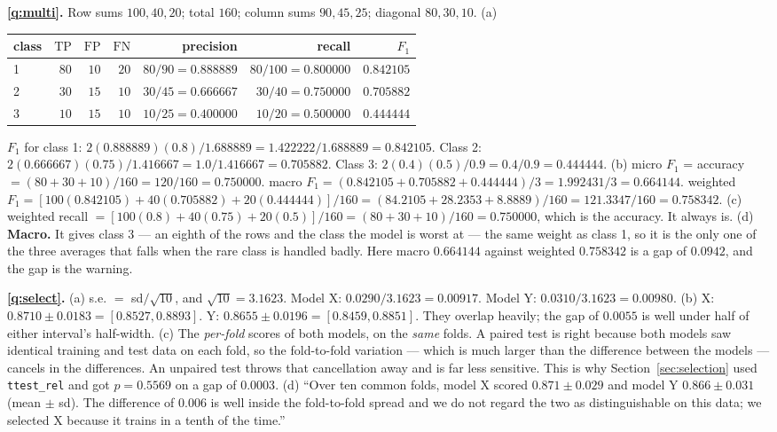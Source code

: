 \documentclass[11pt]{article}
\newcommand{\TP}{\mathrm{TP}}
\newcommand{\FP}{\mathrm{FP}}
\newcommand{\FN}{\mathrm{FN}}
\begin{document}
\medskip
\textbf{\ref{q:multi}.} Row sums $100, 40, 20$; total $160$; column sums
$90, 45, 25$; diagonal $80, 30, 10$.
(a)
\begin{center}\small
\begin{tabular}{@{}lrrrrrr@{}}
\toprule
class & $\TP$ & $\FP$ & $\FN$ & precision & recall & $F_1$\\
\midrule
1 & $80$ & $10$ & $20$ & $80/90 = 0.888889$ & $80/100 = 0.800000$ & $0.842105$\\
2 & $30$ & $15$ & $10$ & $30/45 = 0.666667$ & $30/40 = 0.750000$ & $0.705882$\\
3 & $10$ & $15$ & $10$ & $10/25 = 0.400000$ & $10/20 = 0.500000$ & $0.444444$\\
\bottomrule
\end{tabular}
\end{center}
$F_1$ for class 1: $2(0.888889)(0.8)/1.688889 = 1.422222/1.688889 = 0.842105$.
Class 2: $2(0.666667)(0.75)/1.416667 = 1.0/1.416667 = 0.705882$.
Class 3: $2(0.4)(0.5)/0.9 = 0.4/0.9 = 0.444444$.
(b) micro $F_1$ = accuracy $= (80 + 30 + 10)/160 = 120/160 = \mathbf{0.750000}$.
macro $F_1 = (0.842105 + 0.705882 + 0.444444)/3 = 1.992431/3 =
\mathbf{0.664144}$.
weighted $F_1 = [100(0.842105) + 40(0.705882) + 20(0.444444)]/160
= (84.2105 + 28.2353 + 8.8889)/160 = 121.3347/160 = \mathbf{0.758342}$.
(c) weighted recall $= [100(0.8) + 40(0.75) + 20(0.5)]/160 = (80 + 30 + 10)/160
= 0.750000$, which is the accuracy. It always is.
(d) \textbf{Macro.} It gives class 3 --- an eighth of the rows and the class the
model is worst at --- the same weight as class 1, so it is the only one of the
three averages that falls when the rare class is handled badly. Here macro
$0.664144$ against weighted $0.758342$ is a gap of $0.0942$, and the gap is the
warning.

\medskip
\textbf{\ref{q:select}.} (a) s.e. $=$ sd$/\sqrt{10}$, and $\sqrt{10} = 3.1623$.
Model X: $0.0290/3.1623 = \mathbf{0.00917}$. Model Y: $0.0310/3.1623 =
\mathbf{0.00980}$.
(b) X: $0.8710 \pm 0.0183 = [0.8527, 0.8893]$. Y: $0.8655 \pm 0.0196 =
[0.8459, 0.8851]$. They overlap heavily; the gap of $0.0055$ is well under half
of either interval's half-width.
(c) The \emph{per-fold} scores of both models, on the \emph{same} folds. A paired
test is right because both models saw identical training and test data on each
fold, so the fold-to-fold variation --- which is much larger than the difference
between the models --- cancels in the differences. An unpaired test throws that
cancellation away and is far less sensitive. This is why
Section~\ref{sec:selection} used \texttt{ttest\_rel} and got $p = 0.5569$ on a
gap of $0.0003$.
(d) ``Over ten common folds, model X scored $0.871 \pm 0.029$ and model Y
$0.866 \pm 0.031$ (mean $\pm$ sd). The difference of $0.006$ is well inside the
fold-to-fold spread and we do not regard the two as distinguishable on this
data; we selected X because it trains in a tenth of the time.''
\end{document}
